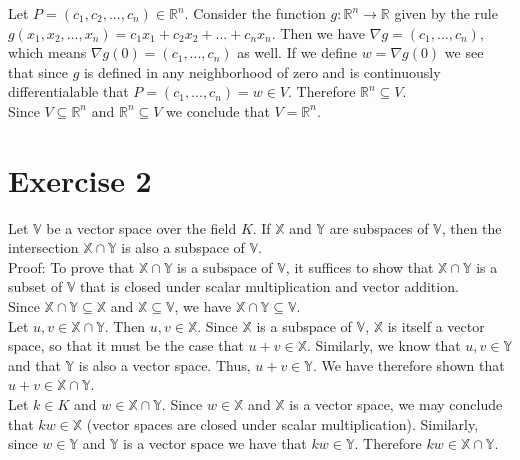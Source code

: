 \documentclass[11pt]{article}
\begin{document}
Let $P = (c_1,c_2,...,c_n) \in \mathbb{R}^n$. Consider the function $g : \mathbb{R}^n \rightarrow \mathbb{R}$ given by the rule $g(x_1,x_2,...,x_n) = c_1x_1 + c_2x_2+...+c_nx_n$. Then we have $\nabla g = (c_1,...,c_n)$, which means $\nabla g(0) = (c_1,...,c_n)$ as well. If we define $w = \nabla g(0)$ we see that since $g$ is defined in any neighborhood of zero and is continuously differentialable that $P = (c_1,...,c_n) = w \in V$. Therefore $\mathbb{R}^n \subseteq V$.\\

Since $V \subseteq \mathbb{R}^n$ and $\mathbb{R}^n \subseteq V$ we conclude that $V = \mathbb{R}^n$.

\section*{Exercise 2}

Let $\mathbb{V}$ be a vector space over the field $K$. If $\mathbb{X}$ and $\mathbb{Y}$ are subspaces of $\mathbb{V}$, then the intersection $\mathbb{X} \cap \mathbb{Y}$ is also a subspace of $\mathbb{V}$.\\

Proof: To prove that $\mathbb{X} \cap \mathbb{Y}$ is a subspace of $\mathbb{V}$, it suffices to show that $\mathbb{X} \cap \mathbb{Y}$ is a subset of $\mathbb{V}$ that is closed under scalar multiplication and vector addition.\\

Since $\mathbb{X} \cap \mathbb{Y}\subseteq \mathbb{X}$ and $\mathbb{X} \subseteq \mathbb{V}$, we have $\mathbb{X} \cap \mathbb{Y} \subseteq \mathbb{V}$. \\

Let $u,v \in \mathbb{X} \cap \mathbb{Y}$. Then $u,v \in \mathbb{X}$. Since $\mathbb{X}$ is a subspace of $\mathbb{V}$, $\mathbb{X}$ is itself a vector space, so that it must be the case that $u + v \in \mathbb{X}$. Similarly, we know that $u,v \in \mathbb{Y}$ and that $\mathbb{Y}$ is also a vector space. Thus, $u + v \in \mathbb{Y}$. We have therefore shown that $u + v \in \mathbb{X}\cap \mathbb{Y}$.\\

Let $k \in K$ and $w \in \mathbb{X}\cap \mathbb{Y}$. Since $w \in \mathbb{X}$ and $\mathbb{X}$ is a vector space, we may conclude that $kw \in \mathbb{X}$ (vector spaces are closed under scalar multiplication). Similarly, since $w \in \mathbb{Y}$ and $\mathbb{Y}$ is a vector space we have that $kw \in \mathbb{Y}$. Therefore $kw \in \mathbb{X} \cap \mathbb{Y}$.\\
\end{document}
